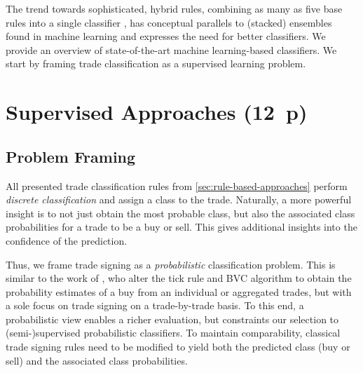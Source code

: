 The trend towards sophisticated, hybrid rules, combining as many as five base rules into a single classifier \autocite[cp.][18]{grauerOptionTradeClassification2022}, has conceptual parallels to (stacked) ensembles found in machine learning and expresses the need for better classifiers. We provide an overview of state-of-the-art machine learning-based classifiers. We start by framing trade classification as a supervised learning
problem.


\newpage
{}
\section{Supervised Approaches (12~p)}\label{sec:supervised-approaches}


\subsection{Problem Framing}\label{sec:problem-framing}

All presented trade classification rules from \cref{sec:rule-based-approaches}  perform \emph{discrete classification} and assign a class to the trade. Naturally, a more powerful insight is to not just obtain the most probable class, but also the associated class probabilities for a trade to be a buy or sell. This gives additional insights into the confidence of the prediction.

Thus, we frame trade signing as a \emph{probabilistic} classification problem. This is similar to the work of \textcite[][272]{easleyDiscerningInformationTrade2016}, who alter the tick rule and \gls{BVC} algorithm to obtain the probability estimates of a buy from an individual or aggregated trades, but with a sole focus on trade signing on a trade-by-trade basis. To this end, a probabilistic view enables a richer evaluation, but constraints our selection to (semi-)supervised probabilistic classifiers. To maintain comparability, classical trade signing rules need to be modified to yield both the predicted class (buy or sell) and the associated class probabilities.

